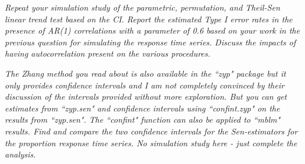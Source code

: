 \documentclass[11pt]{article}
\begin{document}
\begin{enumerate}
\begin{enumerate}
{\end{enumerate}

\item%
{\it Repeat your simulation study of the parametric, permutation, and Theil-Sen linear trend test based on the CI. Report the estimated Type I error rates in the presence of AR(1) correlations with a parameter of 0.6 based on your work in the previous question for simulating the response time series. Discuss the impacts of having autocorrelation present on the various procedures.}

\item%
{\it The Zhang method you read about is also available in the ``zyp" package but it only provides confidence intervals and I am not completely convinced by their discussion of the intervals provided without more exploration. But you can get estimates from ``zyp.sen" and confidence intervals using ``confint.zyp" on the results from ``zyp.sen". The ``confint" function can also be applied to ``mblm" results. Find and compare the two confidence intervals for the Sen-estimators for the proportion response time series. No simulation study here - just complete the analysis.}

\begin{knitrout}
\color{fgcolor}\begin{kframe}
\begin{alltt}
 \hlkwb{<-}  \hlopt{~}   
\end{alltt}


{\ttfamily\noindent\bfseries{}}\begin{alltt}
 \hlkwb{<-} \hlstd{(}\hlstd{(zyp.Year)[}\hlstd{,])}
\end{alltt}


{\ttfamily\noindent\bfseries{}}\end{kframe}
\end{knitrout}
\end{document}
